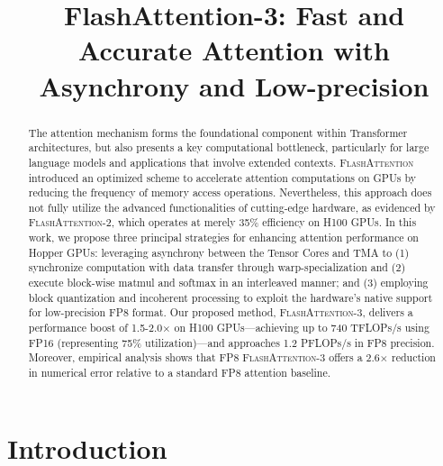\title{FlashAttention-3: Fast and Accurate Attention with Asynchrony and Low-precision}

\begin{abstract}
The attention mechanism forms the foundational component within Transformer architectures, but also presents a key computational bottleneck, particularly for large language models and applications that involve extended contexts. \textsc{FlashAttention} introduced an optimized scheme to accelerate attention computations on GPUs by reducing the frequency of memory access operations. Nevertheless, this approach does not fully utilize the advanced functionalities of cutting-edge hardware, as evidenced by \textsc{FlashAttention-2}, which operates at merely 35\% efficiency on H100 GPUs. In this work, we propose three principal strategies for enhancing attention performance on Hopper GPUs: leveraging asynchrony between the Tensor Cores and TMA to (1) synchronize computation with data transfer through warp-specialization and (2) execute block-wise matmul and softmax in an interleaved manner; and (3) employing block quantization and incoherent processing to exploit the hardware's native support for low-precision FP8 format. Our proposed method, \textsc{FlashAttention-3}, delivers a performance boost of 1.5-2.0$\times$ on H100 GPUs—achieving up to 740 TFLOPs/s using FP16 (representing 75\% utilization)—and approaches 1.2 PFLOPs/s in FP8 precision. Moreover, empirical analysis shows that FP8 \textsc{FlashAttention-3} offers a 2.6$\times$ reduction in numerical error relative to a standard FP8 attention baseline.
\end{abstract}

\section{Introduction}
\label{sec:intro}

